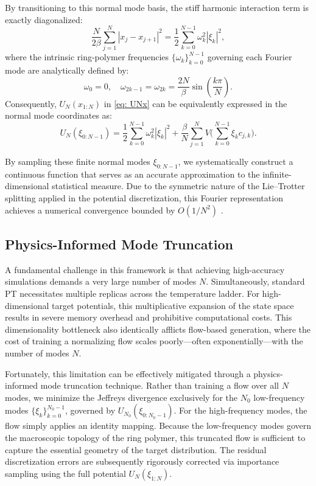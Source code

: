 \documentclass[%
 reprint,
 amsmath,amssymb,
 aps,
 pre,
]{revtex4-2}
\begin{document}
By transitioning to this normal mode basis, the stiff harmonic interaction term is exactly diagonalized:
\begin{equation}
    \frac{N}{2\beta} \sum_{j=1}^N |x_j - x_{j+1}|^2 = \frac{1}{2} \sum_{k=0}^{N-1} \omega_k^2 |\xi_k|^2,
\end{equation}
where the intrinsic ring-polymer frequencies $\{\omega_k\}_{k=0}^{N-1}$ governing each Fourier mode are analytically defined by:
\begin{equation*}
    \omega_0 = 0, \quad \omega_{2k-1} = \omega_{2k} = \frac{2N}{\beta} \sin\left(\frac{k\pi}{N}\right).
\end{equation*}
Consequently, $U_N(x_{1:N})$ in \eqref{eq: UNx} can be equivalently expressed in the normal mode coordinates as:
\begin{equation*}
    U_N(\xi_{0:N-1}) = \frac{1}{2} \sum_{k=0}^{N-1} \omega_k^2 |\xi_k|^2 + \frac{\beta}{N} \sum_{j=1}^N V\bigg( \sum_{k=0}^{N-1} \xi_k c_{j,k} \bigg).
\end{equation*}

By sampling these finite normal modes $\xi_{0:N-1}$, we systematically construct a continuous function that serves as an accurate approximation to the infinite-dimensional statistical measure. Due to the symmetric nature of the Lie--Trotter splitting applied in the potential discretization, this Fourier representation achieves a numerical convergence bounded by $O(1/N^2)$ \cite{ye2023optimal}.

\subsection{Physics-Informed Mode Truncation}

A fundamental challenge in this framework is that achieving high-accuracy simulations demands a very large number of modes $N$. Simultaneously, standard PT necessitates multiple replicas across the temperature ladder. For high-dimensional target potentials, this multiplicative expansion of the state space results in severe memory overhead and prohibitive computational costs. This dimensionality bottleneck also identically afflicts flow-based generation, where the cost of training a normalizing flow scales poorly---often exponentially---with the number of modes $N$.

Fortunately, this limitation can be effectively mitigated through a physics-informed mode truncation technique. Rather than training a flow over all $N$ modes, we minimize the Jeffreys divergence exclusively for the $N_0$ low-frequency modes $\{\xi_k\}_{k=0}^{N_0-1}$, governed by $U_{N_0}(\xi_{0:N_0-1})$. For the high-frequency modes, the flow simply applies an identity mapping. Because the low-frequency modes govern the macroscopic topology of the ring polymer, this truncated flow is sufficient to capture the essential geometry of the target distribution. The residual discretization errors are subsequently rigorously corrected via importance sampling using the full potential $U_N(\xi_{1:N})$.
\end{document}
